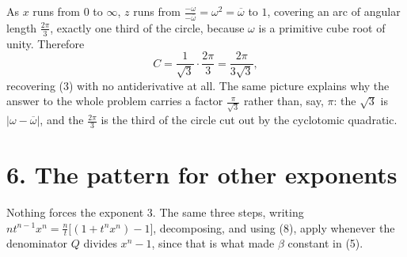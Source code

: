 \documentclass[12pt]{article}
\newcommand{\om}{\omega}
\begin{document}
\begin{center}
\end{center}

As \(x\) runs from \(0\) to \(\infty\), \(z\) runs from
\(\frac{-\om}{-\overline\om}=\om^{2}=\overline\om\) to \(1\), covering an
arc of angular length \(\frac{2\pi}{3}\), exactly one third of the
circle, because \(\om\) is a primitive cube root of unity. Therefore
\[
C=\frac1{\sqrt3}\cdot\frac{2\pi}{3}=\frac{2\pi}{3\sqrt3},
\]
recovering (3) with no antiderivative at all. The same picture explains
why the answer to the whole problem carries a factor \(\frac{\pi}{\sqrt3}\)
rather than, say, \(\pi\): the \(\sqrt3\) is \(|\om-\overline\om|\), and
the \(\frac{2\pi}{3}\) is the third of the circle cut out by the
cyclotomic quadratic.

\section*{6. The pattern for other exponents}

Nothing forces the exponent \(3\). The same three steps, writing
\(nt^{n-1}x^n=\frac{n}{t}\bigl[(1+t^nx^n)-1\bigr]\), decomposing, and using
(8), apply whenever the denominator \(Q\) divides \(x^n-1\), since
that is what made \(\beta\) constant in (5).
\end{document}
